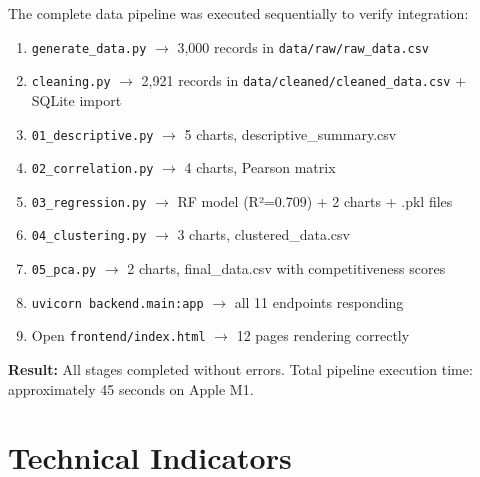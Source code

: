 \documentclass[12pt,a4paper]{report}
\begin{document}
The complete data pipeline was executed sequentially to verify integration:

\begin{enumerate}[itemsep=2pt]
  \item \texttt{generate\_data.py} $\rightarrow$ 3,000 records in \texttt{data/raw/raw\_data.csv}
  \item \texttt{cleaning.py} $\rightarrow$ 2,921 records in \texttt{data/cleaned/cleaned\_data.csv} + SQLite import
  \item \texttt{01\_descriptive.py} $\rightarrow$ 5 charts, descriptive\_summary.csv
  \item \texttt{02\_correlation.py} $\rightarrow$ 4 charts, Pearson matrix
  \item \texttt{03\_regression.py} $\rightarrow$ RF model (R²=0.709) + 2 charts + .pkl files
  \item \texttt{04\_clustering.py} $\rightarrow$ 3 charts, clustered\_data.csv
  \item \texttt{05\_pca.py} $\rightarrow$ 2 charts, final\_data.csv with competitiveness scores
  \item \texttt{uvicorn backend.main:app} $\rightarrow$ all 11 endpoints responding
  \item Open \texttt{frontend/index.html} $\rightarrow$ 12 pages rendering correctly
\end{enumerate}

\textbf{Result:} All stages completed without errors. Total pipeline execution time: approximately 45 seconds on Apple M1.

\section{Technical Indicators}
\end{document}
